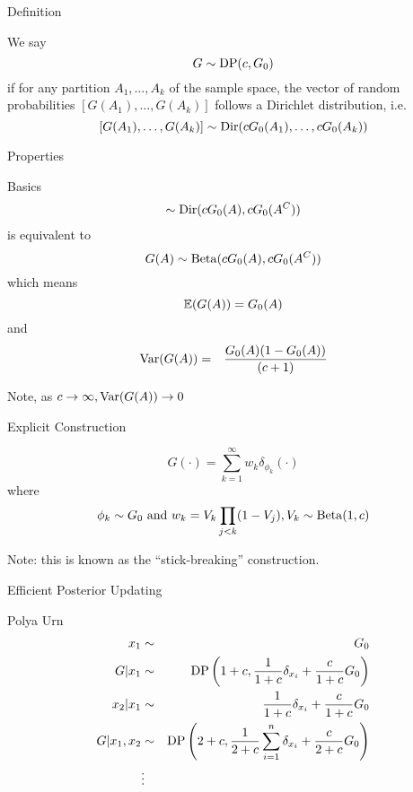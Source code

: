 \begin{frame}[t]{Definition}
\begin{block}{\citet{Ferguson1973}}
We say
 \[G \sim \DP(c,G_0)\]
 if for any partition $A_1, \ldots, A_k$ of the sample space, the vector of random probabilities
$[G(A_1), \ldots, G(A_k)]$ follows a Dirichlet distribution, i.e.
\[[G(A_1), \ldots, G(A_k)] \sim \Dir(cG_0(A_1), \ldots, cG_0(A_k))\]
\end{block}
\end{frame}	

\begin{frame}[t]{Properties}
\begin{block}{Basics}
\begin{eqnarray*} 
[G(A),G(A^C)] \sim \Dir(cG_0(A), cG_0(A^C)) 
\end{eqnarray*}
is equivalent to
\[G(A) \sim \Bet(cG_0(A), cG_0(A^C))\]
which means
\[ \Ave(G(A)) \comment{= \frac{cG_0(A)}{cG_0(A)+cG_0(A^C)}} = G_0(A)\] 
and
 \begin{eqnarray*} 
\Var(G(A)) &=& \comment{\frac{c^2G_0(A)G_0(A^C)}{(cG_0(A)+cG_0(A^C))^2(cG_0(A)+cG_0(A^C)+1)} \\
&=&} \frac{G_0(A)(1-G_0(A))}{(c+1)}
 \end{eqnarray*}
\end{block}
 Note, as $c\rightarrow\infty, \Var(G(A))\rightarrow0$
\end{frame}	

\begin{frame}[t]{Explicit Construction}
\begin{block}{\citet{Sethuraman1994a}}
\[G(\cdot) = \sum_{k=1}^\infty w_k \delta_{\phi_k}(\cdot)\]
where 
\[{\phi_k} \sim G_0 \mbox{ and } w_k = V_k\prod_{j<k}(1-V_j), V_k \sim \Bet(1,c)\]
\end{block}
Note: this is known as the ``stick-breaking'' construction.
\end{frame}	

\begin{frame}[t]{Efficient Posterior Updating}
\begin{block}{Polya Urn \citep{Blackwell1973}}
\begin{eqnarray*}
x_1 &\sim& G_0 \\
G | x_1 &\sim& \DP\left(1+c, \frac{1}{1+c}\delta_{x_i} + \frac{c}{1+c}G_0\right)\\
x_2 | x_1 &\sim& \frac{1}{1+c}\delta_{x_i} + \frac{c}{1+c}G_0 \\
G | x_1, x_2 &\sim& \DP\left(2+c, \frac{1}{2+c}\sum_{i=1}^n \delta_{x_i} + \frac{c}{2+c}G_0\right)\\
&\vdots&\\
\end{eqnarray*}
\end{block}
\end{frame}	


